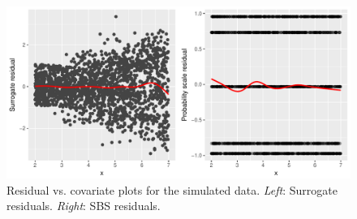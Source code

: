 \begin{figure}[!htbp]
  \centering
  \includegraphics[width=1\textwidth]{heteroscedasticity}
  \caption{Residual vs. covariate plots for the simulated data. \textit{Left}: Surrogate residuals. \textit{Right}: SBS residuals.}
  \label{fig:heteroscedasticity}
\end{figure}


